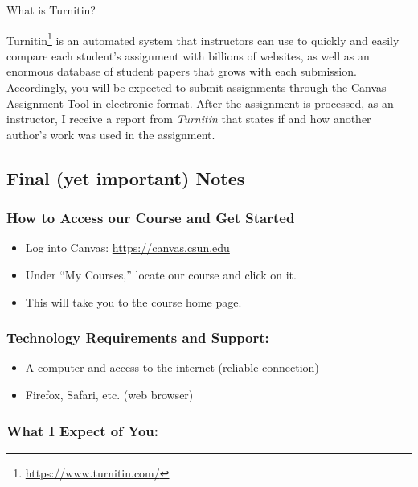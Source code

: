 \documentclass[
  letterpaper,
  DIV=11,
  numbers=noendperiod]{scrartcl}
\providecommand{\tightlist}{%
  \setlength{\itemsep}{0pt}\setlength{\parskip}{0pt}}\usepackage{longtable,booktabs,array}
\DeclareRobustCommand{\href}[2]{#2\footnote{\url{#1}}}
\begin{document}
What is Turnitin?

\href{https://www.turnitin.com/}{Turnitin} is an automated system that
instructors can use to quickly and easily compare each student's
assignment with billions of websites, as well as an enormous database of
student papers that grows with each submission. Accordingly, you will be
expected to submit assignments through the Canvas Assignment Tool in
electronic format. After the assignment is processed, as an instructor,
I receive a report from \emph{Turnitin} that states if and how another
author's work was used in the assignment.

\hypertarget{sec-final-notes}{%
\subsection{Final (yet important) Notes}\label{sec-final-notes}}

\hypertarget{how-to-access-our-course-and-get-started}{%
\subsubsection{How to Access our Course and Get
Started}\label{how-to-access-our-course-and-get-started}}

\begin{itemize}
\tightlist
\item
  Log into Canvas: \url{https://canvas.csun.edu}
\item
  Under ``My Courses,'' locate our course and click on it.
\item
  This will take you to the course home page.
\end{itemize}

\hypertarget{technology-requirements-and-support}{%
\subsubsection{Technology Requirements and
Support:}\label{technology-requirements-and-support}}

\begin{itemize}
\tightlist
\item
  A computer and access to the internet (reliable connection)
\item
  Firefox, Safari, etc. (web browser)
\end{itemize}

\hypertarget{what-i-expect-of-you}{%
\subsubsection{What I Expect of You:}\label{what-i-expect-of-you}}
\end{document}
